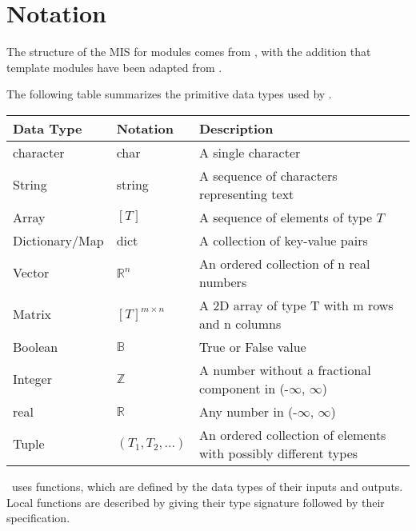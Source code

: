 \documentclass[12pt, titlepage]{article}
\begin{document}
\section{Notation}

The structure of the MIS for modules comes from \citet{HoffmanAndStrooper1995},
with the addition that template modules have been adapted from
\cite{GhezziEtAl2003}.

The following table summarizes the primitive data types used by \progname. 

\begin{center}
\renewcommand{\arraystretch}{1.2}
\noindent 
\begin{tabular}{l l p{7.5cm}} 
\toprule 
\textbf{Data Type} & \textbf{Notation} & \textbf{Description}\\ 
\midrule
character & char & A single character\\
String & string & A sequence of characters representing text\\
Array & $[T]$ & A sequence of elements of type $T$\\
Dictionary/Map & dict & A collection of key-value pairs\\
Vector & $\mathbb{R}^n$ & An ordered collection of n real numbers\\
Matrix &$[T]^{m\times n}$ & A 2D array of type T with m rows and n columns\\
Boolean & $\mathbb{B}$ & True or False value\\
Integer & $\mathbb{Z}$ & A number without a fractional component in (-$\infty$, $\infty$) \\
real & $\mathbb{R}$ & Any number in (-$\infty$, $\infty$)\\
Tuple & $(T_1, T_2, ...)$ & An ordered collection of elements with possibly different types\\
\bottomrule
\end{tabular} 
\end{center}

\noindent
\progname \ uses functions, which
are defined by the data types of their inputs and outputs. Local functions are
described by giving their type signature followed by their specification.
\end{document}
